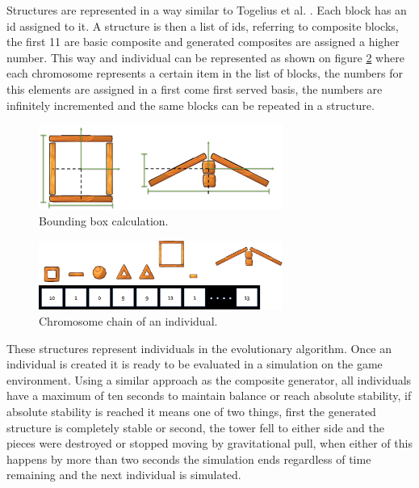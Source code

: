 \documentclass[conference]{IEEEtran}
\begin{document}
    Structures are represented in a way similar to Togelius et al.
    \cite{togelius2016Representationsforsearch-basedmethods}. Each block has
    an id assigned to it. A structure is then a list of ids, referring to
    composite blocks, the first 11 are basic composite and generated composites 
    are assigned a higher number.  This way and individual can be
    represented as shown on figure \ref{old_chrom} where each chromosome
    represents a certain item in the list of blocks, the numbers for this
    elements are assigned in a first come first served basis, the numbers are
    infinitely incremented and the same blocks can be repeated in a structure.
    
    \begin{figure}[htbp]
    \centerline{\includegraphics[width=80mm]{Images/bounding_box_calculation.png}}
    \caption{Bounding box calculation.}
    \label{bounding_boc_calc}
    \end{figure}
    
    \begin{figure}[htbp]
    \centerline{\includegraphics[width=80mm]{Images/chromosome_chain_example.png}}
    \caption{Chromosome chain of an individual.}
    \label{old_chrom}
    \end{figure}
    
    These structures represent individuals in the evolutionary algorithm. Once
    an individual is created it is ready to be evaluated in a simulation on the
    game environment. Using a similar approach as the composite generator, all
    individuals have a maximum of ten seconds to maintain balance or reach
    absolute stability, if absolute stability is reached it means one of two
    things, first the generated structure is completely stable or second, the
    tower fell to either side and the pieces were destroyed or stopped moving by
    gravitational pull, when either of this happens by more than two seconds the
    simulation ends regardless of time remaining and the next individual is
    simulated.
\end{document}
